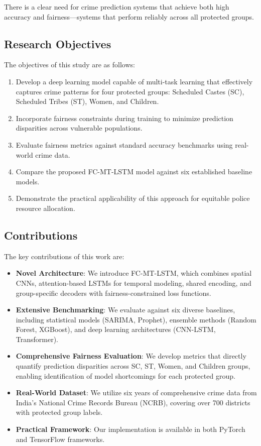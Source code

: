 \documentclass[conference]{IEEEtran}
\begin{document}
There is a clear need for crime prediction systems that achieve both high accuracy and fairness---systems that perform reliably across all protected groups.

\subsection{Research Objectives}

The objectives of this study are as follows:
\begin{enumerate}
    \item Develop a deep learning model capable of multi-task learning that effectively captures crime patterns for four protected groups: Scheduled Castes (SC), Scheduled Tribes (ST), Women, and Children.
    \item Incorporate fairness constraints during training to minimize prediction disparities across vulnerable populations.
    \item Evaluate fairness metrics against standard accuracy benchmarks using real-world crime data.
    \item Compare the proposed FC-MT-LSTM model against six established baseline models.
    \item Demonstrate the practical applicability of this approach for equitable police resource allocation.
\end{enumerate}

\subsection{Contributions}

The key contributions of this work are:
\begin{itemize}
    \item \textbf{Novel Architecture}: We introduce FC-MT-LSTM, which combines spatial CNNs, attention-based LSTMs for temporal modeling, shared encoding, and group-specific decoders with fairness-constrained loss functions.
    \item \textbf{Extensive Benchmarking}: We evaluate against six diverse baselines, including statistical models (SARIMA, Prophet), ensemble methods (Random Forest, XGBoost), and deep learning architectures (CNN-LSTM, Transformer).
    \item \textbf{Comprehensive Fairness Evaluation}: We develop metrics that directly quantify prediction disparities across SC, ST, Women, and Children groups, enabling identification of model shortcomings for each protected group.
    \item \textbf{Real-World Dataset}: We utilize six years of comprehensive crime data from India's National Crime Records Bureau (NCRB), covering over 700 districts with protected group labels.
    \item \textbf{Practical Framework}: Our implementation is available in both PyTorch and TensorFlow frameworks.
\end{itemize}
\end{document}
